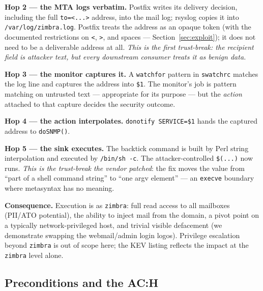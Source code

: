 \documentclass[journal]{IEEEtran}
\begin{document}
\textbf{Hop 2 — the MTA logs verbatim.} Postfix writes its delivery decision,
including the full \texttt{to=<...>} address, into the mail log; rsyslog
copies it into \texttt{/var/log/zimbra.log}. Postfix treats the address as an
opaque token (with the documented restrictions on \texttt{<}, \texttt{>}, and
spaces — Section~\ref{sec:exploit}); it does not need to be a deliverable
address at all. \emph{This is the first trust-break: the recipient field is
attacker text, but every downstream consumer treats it as benign data.}

\textbf{Hop 3 — the monitor captures it.} A \texttt{watchfor} pattern in
\texttt{swatchrc} matches the log line and captures the address into
\texttt{\$1}. The monitor's job is pattern matching on untrusted text —
appropriate for its purpose — but the \emph{action} attached to that capture
decides the security outcome.

\textbf{Hop 4 — the action interpolates.} \texttt{donotify SERVICE=\$1}
hands the captured address to \texttt{doSNMP()}.

\textbf{Hop 5 — the sink executes.} The backtick command is built by Perl
string interpolation and executed by \texttt{/bin/sh -c}. The
attacker-controlled \texttt{\$(...)} now runs. \emph{This is the trust-break
the vendor patched}: the fix moves the value from ``part of a shell command
string'' to ``one argv element'' — an \texttt{execve} boundary where
metasyntax has no meaning.

\textbf{Consequence.} Execution is as \texttt{zimbra}: full read access to
all mailboxes (PII/ATO potential), the ability to inject mail from the
domain, a pivot point on a typically network-privileged host, and trivial
visible defacement (we demonstrate swapping the webmail/admin login logos).
Privilege escalation beyond \texttt{zimbra} is out of scope here; the KEV
listing reflects the impact at the \texttt{zimbra} level alone.

\subsection{Preconditions and the AC:H}
\label{sec:precond}
\end{document}
